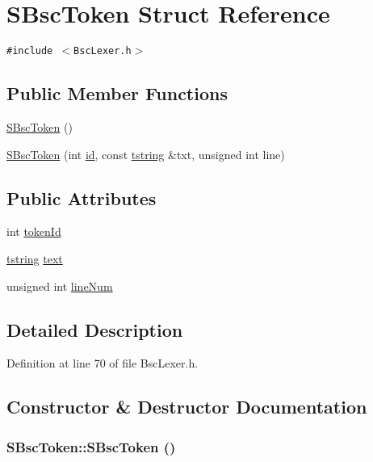 \hypertarget{struct_s_bsc_token}{
\section{SBscToken Struct Reference}
\label{struct_s_bsc_token}
}
{\tt \#include $<$BscLexer.h$>$}

\subsection*{Public Member Functions}
\begin{CompactItemize}
\item 
\hyperlink{struct_s_bsc_token_114bc5be1bcad769ad1a142cfd3b9081}{SBscToken} ()
\item 
\hyperlink{struct_s_bsc_token_1ecf4a1d225a56ce532f5c54d3ba7649}{SBscToken} (int \hyperlink{glext__bak_8h_58c2a664503e14ffb8f21012aabff3e9}{id}, const \hyperlink{common__afx_8h_816fa58fd77499b0edb2c69ebe803d5c}{tstring} \&txt, unsigned int line)
\end{CompactItemize}
\subsection*{Public Attributes}
\begin{CompactItemize}
\item 
int \hyperlink{struct_s_bsc_token_0c4dfdfcd3c3fcbffd6bb515b7e7a1c4}{tokenId}
\item 
\hyperlink{common__afx_8h_816fa58fd77499b0edb2c69ebe803d5c}{tstring} \hyperlink{struct_s_bsc_token_cecfc1abee39ac469aeda97016d2e5fe}{text}
\item 
unsigned int \hyperlink{struct_s_bsc_token_dbc25dbe5769bbd0be6cf95e2b7fab77}{lineNum}
\end{CompactItemize}


\subsection{Detailed Description}


Definition at line 70 of file BscLexer.h.

\subsection{Constructor \& Destructor Documentation}
\hypertarget{struct_s_bsc_token_114bc5be1bcad769ad1a142cfd3b9081}{
\subsubsection[{SBscToken}]{\setlength{\rightskip}{0pt plus 5cm}SBscToken::SBscToken ()}}
\label{struct_s_bsc_token_114bc5be1bcad769ad1a142cfd3b9081}




